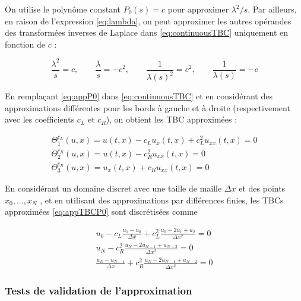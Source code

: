 \indent On utilise le polynôme constant $P_0(s) = c$  pour approximer $\lambda^2/s$. Par ailleurs, en raison de l'expression \eqref{eq:lambda}, on peut approximer les autres opérandes des transformées inverses de Laplace dans \eqref{eq:continuousTBC} uniquement en fonction de $c$ :

\begin{equation}
	\label{eq:appP0}
	\frac{\lambda^2}{s}  = c, \qquad
	\frac{\lambda}{s}  = -c^2, \qquad
	\frac{1}{\lambda(s)^2}  = c^2,\qquad 
	 \frac{1}{\lambda(s)}  = -c 
\end{equation}

\indent En remplaçant \eqref{eq:appP0}  dans \eqref{eq:continuousTBC} et en considérant des approximations différentes pour les bords à gauche et à droite (respectivement avec les coefficients $c_L$ et $c_R$), on obtient les TBC approximées :

\begin{equation}
\label{eq:appTBCP0}
    \begin{gathered}
        \Theta_1^{c_L}(u,x) = u(t,x) - c_L u_x(t,x)  + c_L^2  u_{xx}(t,x) = 0 \\
        \Theta_2^{c_R}(u,x) = u(t,x) - c_R^2  u_{xx}(t,x) = 0 \\
        \Theta_3^{c_R}(u,x) = u_x(t,x) + c_R u_{xx}(t,x)= 0 
    \end{gathered}
\end{equation}

\indent En considérant un domaine discret avec une taille de maille $\Delta x$ et des points $x_0, ..., x_N$ , et en utilisant des approximations par différences finies, les TBCs approximées \eqref{eq:appTBCP0} sont discrétisées comme

\begin{equation*}
    \begin{gathered}
        u_0 - c_L \frac{u_1 - u_0}{\Delta x}  + c_L^2  \frac{u_0 -2u_1 + u_2}{\Delta x^2} = 0 \\
        u_N - c_R^2    \frac{u_N -2u_{N-1} + u_{N-2}}{\Delta x^2} = 0 \\
        \frac{u_N - u_{N-1}}{\Delta x}  + c_R^2    \frac{u_N -2u_{N-1} + u_{N-2}}{\Delta x^2} = 0 
    \end{gathered}
\end{equation*}

\subsubsection{Tests de validation de l'approximation}

